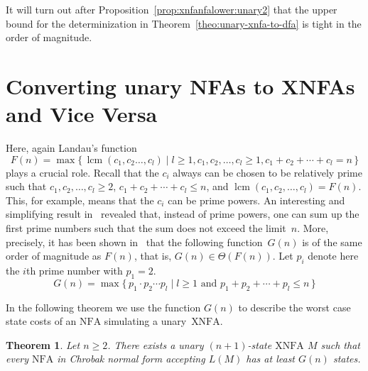 \documentclass[final,copyright,noderivs]{eptcs}
\theoremstyle{plain}
\newtheorem{theorem}{Theorem}
\theoremstyle{definition}
\DeclareMathOperator{\lcm}{lcm}
\newcommand{\nfa}{\textrm{NFA}}
\newcommand{\xnfa}{\textrm{XNFA}}
\begin{document}
It will turn out after Proposition~\ref{prop:xnfanfalower:unary2} that 
the upper bound for the determinization in
Theorem~\ref{theo:unary-xnfa-to-dfa} is tight in the order of magnitude.

\section{Converting unary NFAs to XNFAs and Vice Versa}\label{sect:nondet}

\begin{sloppypar}
Here, again Landau's function 
$$
F(n)=\max \{\,\lcm(c_1,c_2\dots,c_l) \mid l\geq 1, c_1,c_2,\dots,c_l \geq 1, 
c_1+c_2+\cdots + c_l=n\,\}
$$
plays a crucial role.
Recall that the $c_i$ always can be chosen to be relatively prime
such that \mbox{$c_1,c_2, \dots, c_l \geq 2$,}
$c_1+c_2+\cdots +c_l \leq n$, and \mbox{$\lcm(c_1,c_2,\dots, c_l) = F(n)$}.
This, for
example, means that the $c_i$ can be prime powers. An interesting and
simplifying result in~\cite{miller:1987:mog} revealed that, instead of
prime powers, one can sum up the first prime numbers such that the 
sum does not exceed the limit~$n$. More, precisely,
it has been shown in~\cite{miller:1987:mog} that the following function~$G(n)$ 
is of the same order of magnitude as $F(n)$, that is, $G(n)\in \Theta (F(n))$.
Let $p_i$ denote here the $i$th prime number with $p_1=2$.
$$
G(n)= \max \{\,p_1\cdot p_2\cdots  p_l \mid l\geq 1 \text{ and } p_1+p_2+\cdots + p_l\le n\,\}
$$
\end{sloppypar}

In the following theorem we use the function $G(n)$ to describe the worst case
state costs of an $\nfa$ simulating a unary~$\xnfa$.

\begin{theorem}\label{theo:xnfanfalower:unary} 
Let $n\geq 2$. There exists a unary $(n+1)$-state $\xnfa$ $M$ such that every 
$\nfa$ in Chrobak normal form accepting $L(M)$ has at least $G(n)$ states.
\end{theorem}
\end{document}
